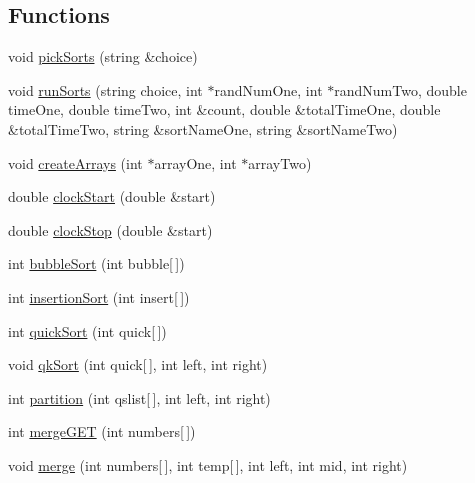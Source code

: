 \subsection*{Functions}
\begin{DoxyCompactItemize}
\item 
void \hyperlink{_delouth_mansfield-_assn4-_sort_prog_8cpp_a401a41ad70746c8dd39ecc19286b5e38}{pickSorts} (string \&choice)
\item 
void \hyperlink{_delouth_mansfield-_assn4-_sort_prog_8cpp_acd0f7b42076b153145b2198ffad4a0c2}{runSorts} (string choice, int $\ast$randNumOne, int $\ast$randNumTwo, double timeOne, double timeTwo, int \&count, double \&totalTimeOne, double \&totalTimeTwo, string \&sortNameOne, string \&sortNameTwo)
\item 
void \hyperlink{_delouth_mansfield-_assn4-_sort_prog_8cpp_af209aad9d447548ca062515ab1acbe3c}{createArrays} (int $\ast$arrayOne, int $\ast$arrayTwo)
\item 
double \hyperlink{_delouth_mansfield-_assn4-_sort_prog_8cpp_a97da3b77b5ebacff9297f22e54185c1a}{clockStart} (double \&start)
\item 
double \hyperlink{_delouth_mansfield-_assn4-_sort_prog_8cpp_aa5a4dbee524f1aa5d109bcdeeda1b9f6}{clockStop} (double \&start)
\item 
int \hyperlink{_delouth_mansfield-_assn4-_sort_prog_8cpp_a8bb793ac49cd588089713622d18a8c5b}{bubbleSort} (int bubble\mbox{[}$\,$\mbox{]})
\item 
int \hyperlink{_delouth_mansfield-_assn4-_sort_prog_8cpp_abdd451b9bf57eb321b817db4405d65fd}{insertionSort} (int insert\mbox{[}$\,$\mbox{]})
\item 
int \hyperlink{_delouth_mansfield-_assn4-_sort_prog_8cpp_a9e940b0f849a62e9ff4319606269ae38}{quickSort} (int quick\mbox{[}$\,$\mbox{]})
\item 
void \hyperlink{_delouth_mansfield-_assn4-_sort_prog_8cpp_a4b4f1e40ba9dfe94bf95212975063b17}{qkSort} (int quick\mbox{[}$\,$\mbox{]}, int left, int right)
\item 
int \hyperlink{_delouth_mansfield-_assn4-_sort_prog_8cpp_af199bb360825bf6dbcb98371c70419e1}{partition} (int qslist\mbox{[}$\,$\mbox{]}, int left, int right)
\item 
int \hyperlink{_delouth_mansfield-_assn4-_sort_prog_8cpp_a5bf887ba10188a54f08008fba4edd364}{mergeGET} (int numbers\mbox{[}$\,$\mbox{]})
\item 
void \hyperlink{_delouth_mansfield-_assn4-_sort_prog_8cpp_a22dd5c604dfcb67bc46bfd4bbb97d2f0}{merge} (int numbers\mbox{[}$\,$\mbox{]}, int temp\mbox{[}$\,$\mbox{]}, int left, int mid, int right)

\end{DoxyCompactItemize}
